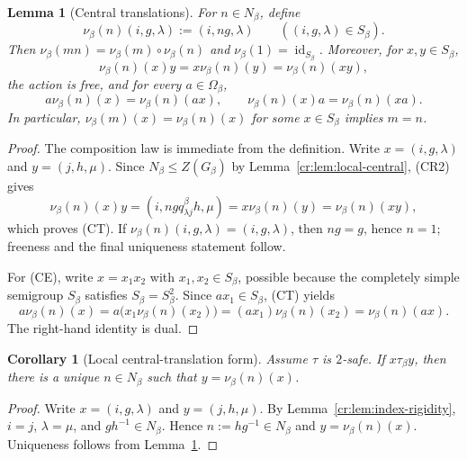 \documentclass[10pt,a4paper]{article}
\newtheorem{lemma}[theorem]{Lemma}
\newtheorem{corollary}[theorem]{Corollary}
\theoremstyle{definition}
\theoremstyle{remark}
\begin{document}
\begin{lemma}[Central translations]
\label{cr:lem:central-translations}
For \(n\in N_\beta\), define
\[
\nu_\beta(n)(i,g,\lambda):=(i,ng,\lambda)
\qquad((i,g,\lambda)\in S_\beta).
\]
Then \(\nu_\beta(mn)=\nu_\beta(m)\circ\nu_\beta(n)\) and
\(\nu_\beta(1)=\operatorname{id}_{S_\beta}\).  Moreover, for
\(x,y\in S_\beta\),
\[
\nu_\beta(n)(x)y=x\nu_\beta(n)(y)=\nu_\beta(n)(xy),
\tag{CT}
\]
the action is free, and for every \(a\in\Omega_\beta\),
\[
a\nu_\beta(n)(x)=\nu_\beta(n)(ax),
\qquad
\nu_\beta(n)(x)a=\nu_\beta(n)(xa).
\tag{CE}
\]
In particular, \(\nu_\beta(m)(x)=\nu_\beta(n)(x)\) for some \(x\in S_\beta\)
implies \(m=n\).
\end{lemma}

\begin{proof}
The composition law is immediate from the definition.  Write
\(x=(i,g,\lambda)\) and \(y=(j,h,\mu)\).  Since
\(N_\beta\le Z(G_\beta)\) by Lemma~\ref{cr:lem:local-central},
\textup{(CR2)} gives
\[
\nu_\beta(n)(x)y
=(i,ngq^\beta_{\lambda j}h,\mu)
=x\nu_\beta(n)(y)
=\nu_\beta(n)(xy),
\]
which proves \textup{(CT)}.  If \(\nu_\beta(n)(i,g,\lambda)=(i,g,\lambda)\),
then \(ng=g\), hence \(n=1\); freeness and the final uniqueness statement
follow.

For \textup{(CE)}, write \(x=x_1x_2\) with \(x_1,x_2\in S_\beta\), possible
because the completely simple semigroup \(S_\beta\) satisfies
\(S_\beta=S_\beta^2\).  Since \(ax_1\in S_\beta\), \textup{(CT)} yields
\[
a\nu_\beta(n)(x)
=a\bigl(x_1\nu_\beta(n)(x_2)\bigr)
=(ax_1)\nu_\beta(n)(x_2)
=\nu_\beta(n)(ax).
\]
The right-hand identity is dual.
\end{proof}

\begin{corollary}[Local central-translation form]
\label{cr:cor:local-translation}
Assume \(\tau\) is \(2\)-safe.  If \(x\tau_\beta y\), then there is a unique
\(n\in N_\beta\) such that \(y=\nu_\beta(n)(x)\).
\end{corollary}

\begin{proof}
Write \(x=(i,g,\lambda)\) and \(y=(j,h,\mu)\).  By
Lemma~\ref{cr:lem:index-rigidity}, \(i=j\), \(\lambda=\mu\), and
\(gh^{-1}\in N_\beta\).  Hence \(n:=hg^{-1}\in N_\beta\) and
\(y=\nu_\beta(n)(x)\).  Uniqueness follows from
Lemma~\ref{cr:lem:central-translations}.
\end{proof}
\end{document}
